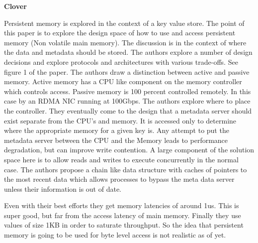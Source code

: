 

\textbf{Clover~\cite{clover}}

Persistent memory is explored in the context of a key value store. The point
of this paper is to explore the design space of how to use and access
persistent memory (Non volatile main memory). The discussion is in the
context of where the data and metadata should be stored. The authors explore
a number of design decisions and explore protocols and architectures with
various trade-offs. See figure 1 of the paper. The authors draw a distinction
between active and passive memory. Active memory has a CPU like component on
the memory controller which controls access. Passive memory is 100 percent
controlled remotely. In this case by an RDMA NIC running at 100Gbps. The
authors explore where to place the controller. They eventually come to the
design that a metadata server should exist separate from the CPU's and
memory. It is accessed only to determine where the appropriate memory for a
given key is. Any attempt to put the metadata server between the CPU and the
Memory leads to performance degradation, but can improve write contention. A
large component of the solution space here is to allow reads and writes to
execute concurrently in the normal case. The authors propose a chain like data
structure with caches of pointers to the most recent data which allows
processes to bypass the meta data server unless their information is out of
date. 

Even with their best efforts they get memory latencies of around 1us. This is
super good, but far from the access latency of main memory. Finally they use
values of size 1KB in order to saturate throughput. So the idea that
persistent memory is going to be used for byte level access is not realistic
as of yet.

